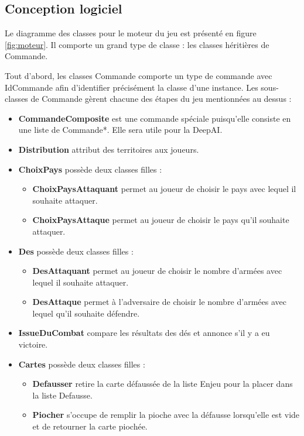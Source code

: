 \newpage
\subsection{Conception logiciel}
Le diagramme des classes pour le moteur du jeu est présenté en figure \ref{fig:moteur}. Il comporte un grand type de classe : les classes héritières de Commande.

Tout d'abord, les classes Commande comporte un type de commande avec IdCommande afin d'identifier précisément la classe d’une instance. Les sous-classes de Commande gèrent chacune des étapes du jeu mentionnées au dessus :
\begin{itemize}
    \item \textbf{CommandeComposite} est une commande spéciale puisqu'elle consiste en une liste de Commande*. Elle sera utile pour la DeepAI.

    \item \textbf{Distribution} attribut des territoires aux joueurs.
    
    \item \textbf{ChoixPays} possède deux classes filles :
    \begin{itemize}
        \item \textbf{ChoixPaysAttaquant} permet au joueur de choisir le pays avec lequel il souhaite attaquer.
        \item \textbf{ChoixPaysAttaque} permet au joueur de choisir le pays qu'il souhaite attaquer.
    \end{itemize}
    
    \item \textbf{Des} possède deux classes filles :
    \begin{itemize}
        \item \textbf{DesAttaquant} permet au joueur de choisir le nombre d'armées avec lequel il souhaite attaquer.
        \item \textbf{DesAttaque} permet à l'adversaire de choisir le nombre d'armées avec lequel qu'il souhaite défendre.
    \end{itemize}
    
    \item \textbf{IssueDuCombat} compare les résultats des dés et annonce s'il y a eu victoire.
    
    \item \textbf{Cartes} possède deux classes filles :
    \begin{itemize}
        \item \textbf{Defausser} retire la carte défaussée de la liste Enjeu pour la placer dans la liste Defausse.
        \item \textbf{Piocher} s'occupe de remplir la pioche avec la défausse lorsqu'elle est vide et de retourner la carte piochée.
    \end{itemize}
    

\end{itemize}
